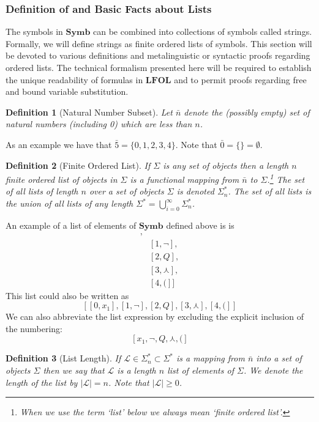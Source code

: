 \documentclass[12pt]{article}
\theoremstyle{break}
\newtheorem{definition}{Definition}[section]
\theoremstyle{break}
\theoremstyle{break}
\theoremstyle{break}
\theoremstyle{break}
\newtheorem{informal definition}[definition]{Informal Definition}
\newcommand{\mc}[1]{\mathcal{#1}}
\begin{document}
\subsubsection{Definition of and Basic Facts about Lists}
The symbols in $\textbf{Symb}$ can be combined into collections of symbols called strings.
Formally, we will define strings as finite ordered lists of symbols.
This section will be devoted to various definitions and metalinguistic or syntactic proofs regarding ordered lists.
The technical formalism presented here will be required to establish the unique readability of formulas in $\textbf{LFOL}$ and to permit proofs regarding free and bound variable substitution.

\begin{definition}[Natural Number Subset]
Let $\bar{n}$ denote the (possibly empty) set of natural numbers (including 0) which are less than $n$.
\end{definition}

As an example we have that $\bar{5} = \{0, 1, 2, 3, 4\}$.
Note that $\bar{0} = \{\} = \emptyset$.

\begin{definition}[Finite Ordered List]
If $\Sigma$ is any set of objects then a length $n$ finite ordered list of objects in $\Sigma$ is a functional mapping from $\bar{n}$ to $\Sigma$.\footnote{When we use the term `list' below we always mean `finite ordered list'.}
The set of all lists of length $n$ over a set of objects $\Sigma$ is denoted $\Sigma_n^*$.
The set of all lists is the union of all lists of any length $\Sigma^* = \bigcup_{i=0}^{\infty} \Sigma_n^*$.
\end{definition}


An example of a list of elements of $\textbf{Symb}$ defined above is is
\begin{align*}
[&[0, x_1],\\
&[1, \lnot],\\
&[2, Q],\\
&[3, \curlywedge],\\
&[4, (]]
\end{align*}
This list could also be written as
$$
[[0, x_1], [1, \lnot], [2, Q], [3, \curlywedge], [4, (]]
$$
We can also abbreviate the list expression by excluding the explicit inclusion of the numbering:
$$
[x_1, \lnot, Q, \curlywedge, (]
$$

\begin{definition}[List Length]
If $\mc{L}\in\Sigma_n^*\subset \Sigma^*$ is a mapping from $\bar{n}$ into a set of objects $\Sigma$ then we say that $\mc{L}$ is a length $n$ list of elements of $\Sigma$.
We denote the length of the list by $|\mc{L}| = n$.
Note that $|\mc{L}| \ge 0$.
\end{definition}
\end{document}
